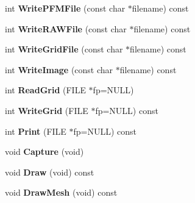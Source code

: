 \begin{DoxyCompactItemize}
\item 
int {\bfseries Write\+P\+F\+M\+File} (const char $\ast$filename) const \hypertarget{class_r2_grid_a67ed84304fd605f93562988d5b91f8a3}{}\label{class_r2_grid_a67ed84304fd605f93562988d5b91f8a3}

\item 
int {\bfseries Write\+R\+A\+W\+File} (const char $\ast$filename) const \hypertarget{class_r2_grid_ac808d29a2bd40b761711849082838a1f}{}\label{class_r2_grid_ac808d29a2bd40b761711849082838a1f}

\item 
int {\bfseries Write\+Grid\+File} (const char $\ast$filename) const \hypertarget{class_r2_grid_aabbe9c5235be99aa07a3873ce643136b}{}\label{class_r2_grid_aabbe9c5235be99aa07a3873ce643136b}

\item 
int {\bfseries Write\+Image} (const char $\ast$filename) const \hypertarget{class_r2_grid_aca88c2cd97029b4d777d77b6b14a8dfe}{}\label{class_r2_grid_aca88c2cd97029b4d777d77b6b14a8dfe}

\item 
int {\bfseries Read\+Grid} (F\+I\+LE $\ast$fp=N\+U\+LL)\hypertarget{class_r2_grid_a02bdfd5ff2124d8b451219edd77ecdde}{}\label{class_r2_grid_a02bdfd5ff2124d8b451219edd77ecdde}

\item 
int {\bfseries Write\+Grid} (F\+I\+LE $\ast$fp=N\+U\+LL) const \hypertarget{class_r2_grid_a19bbf729d97981b636449a784d27c352}{}\label{class_r2_grid_a19bbf729d97981b636449a784d27c352}

\item 
int {\bfseries Print} (F\+I\+LE $\ast$fp=N\+U\+LL) const \hypertarget{class_r2_grid_aac6c0ff9ba482ab20a17b9de0ddff23b}{}\label{class_r2_grid_aac6c0ff9ba482ab20a17b9de0ddff23b}

\item 
void {\bfseries Capture} (void)\hypertarget{class_r2_grid_a7933cdfa170093eb96db0b7db233f741}{}\label{class_r2_grid_a7933cdfa170093eb96db0b7db233f741}

\item 
void {\bfseries Draw} (void) const \hypertarget{class_r2_grid_a3010e3a937b92cde49b58696de072f33}{}\label{class_r2_grid_a3010e3a937b92cde49b58696de072f33}

\item 
void {\bfseries Draw\+Mesh} (void) const \hypertarget{class_r2_grid_ae53473424e80ee72a21eaa5dcda6d25d}{}\label{class_r2_grid_ae53473424e80ee72a21eaa5dcda6d25d}


\end{DoxyCompactItemize}
